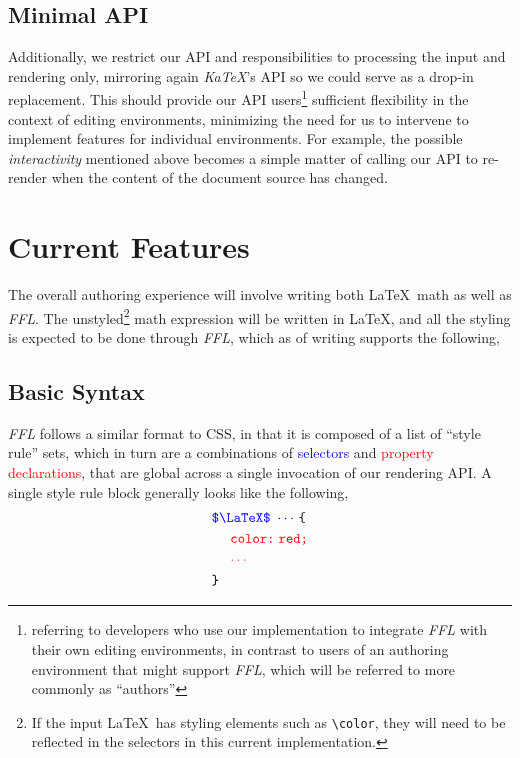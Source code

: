 \documentclass{article}
\begin{document}
\begin{multicols*}{2}
  \subsection*{Minimal API}
  Additionally, we restrict our API and responsibilities to processing the input and
  rendering only, mirroring again \textit{KaTeX}'s API so we could serve as
  a drop-in replacement. This should provide our API users\footnote{referring to developers
    who use our implementation to integrate \textit{FFL} with their own editing environments,
    in contrast to users of an authoring environment that might support \textit{FFL},
    which will be referred to more commonly as ``authors''} sufficient flexibility
  in the context of editing environments, minimizing the need for us to intervene to
  implement features for individual environments. For example,
  the possible \textit{interactivity} mentioned above becomes a simple matter of
  calling our API to re-render when the content of the document source has changed.
  \section*{Current Features}
  The overall authoring experience will involve writing both \LaTeX\ math as well
  as \textit{FFL}. The unstyled\footnote{If the input \LaTeX\ has styling elements
    such as \texttt{\textbackslash color}, they will need to be reflected in the selectors
    in this current implementation.} math expression will be written in \LaTeX, and
  all the styling is expected to be done through \textit{FFL}, which
  as of writing supports the following,
  \subsection*{Basic Syntax}
  \textit{FFL} follows a similar format to CSS, in that it is composed of a list
  of ``style rule'' sets, which in turn are a combinations of \textcolor{blue}{selectors}
  and \textcolor{red}{property declarations}, that are global across a single invocation of our rendering
  API. A single style rule block generally looks like the following,
  \begin{align*}
     & \textcolor{blue}{\texttt{\$\textbackslash LaTeX\$}\ \cdots}\ \texttt{\{} \\
     & \ \ \ \ \textcolor{red}{\texttt{color:\;red;}}                           \\
     & \ \ \ \ \textcolor{red}\cdots                                            \\
     & \texttt{\}}
  \end{align*}

\end{multicols*}
\end{document}
